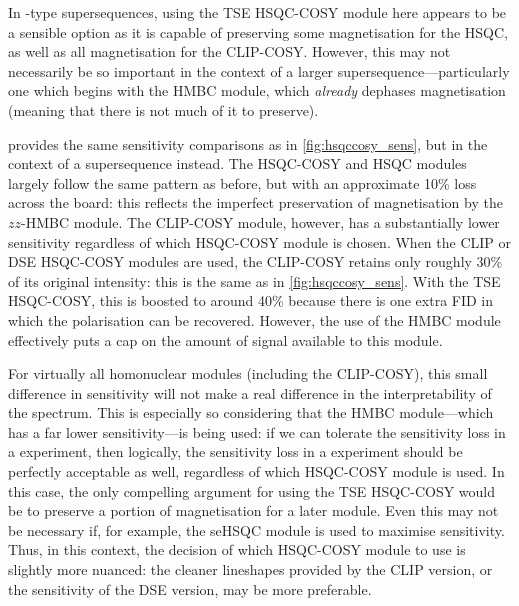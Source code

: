 In -type supersequences, using the TSE HSQC-COSY module here appears to be a sensible option as it is capable of preserving some  magnetisation for the HSQC, as well as all  magnetisation for the CLIP-COSY.
However, this may not necessarily be so important in the context of a larger supersequence---particularly one which begins with the HMBC module, which \textit{already} dephases  magnetisation (meaning that there is not much of it to preserve).

 provides the same sensitivity comparisons as in \cref{fig:hsqccosy_sens}, but in the context of a  supersequence instead.
The HSQC-COSY and HSQC modules largely follow the same pattern as before, but with an approximate 10\% loss across the board: this reflects the imperfect preservation of  magnetisation by the $zz$-HMBC module.
The CLIP-COSY module, however, has a substantially lower sensitivity regardless of which HSQC-COSY module is chosen.
When the CLIP or DSE HSQC-COSY modules are used, the CLIP-COSY retains only roughly 30\% of its original intensity: this is the same as in \cref{fig:hsqccosy_sens}.
With the TSE HSQC-COSY, this is boosted to around 40\% because there is one extra FID in which the  polarisation can be recovered.
However, the use of the HMBC module effectively puts a cap on the amount of signal available to this module.

For virtually all homonuclear modules (including the CLIP-COSY), this small difference in sensitivity will not make a real difference in the interpretability of the spectrum.
This is especially so considering that the HMBC module---which has a far lower sensitivity---is being used:
if we can tolerate the sensitivity loss in a  experiment, then logically, the sensitivity loss in a  experiment should be perfectly acceptable as well, regardless of which HSQC-COSY module is used.
In this case, the only compelling argument for using the TSE HSQC-COSY would be to preserve a portion of  magnetisation for a later \carbon{} module.
Even this may not be necessary if, for example, the seHSQC module is used to maximise sensitivity.
Thus, in this context, the decision of which HSQC-COSY module to use is slightly more nuanced: the cleaner lineshapes provided by the CLIP version, or the sensitivity of the DSE version, may be more preferable.
